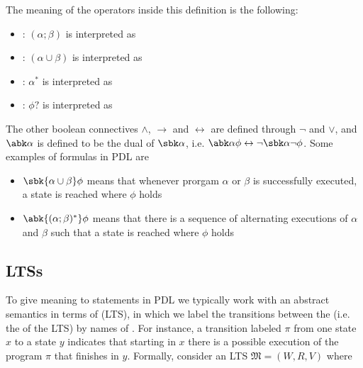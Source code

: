 \documentclass[a4paper, 12pt]{report}
\begin{document}
    The meaning of the operators inside this definition is the following:

    \begin{itemize}
        \item {}: $(\alpha ; \beta)$ is interpreted as 
        \item {}: $(\alpha \cup \beta)$ is interpreted as 
        \item {}: $\alpha^*$ is interpreted as 
        \item {}: $\phi?$ is interpreted as 
    \end{itemize}

    The other boolean connectives $\land$, $\to$ and $\leftrightarrow$ are defined through $\lnot$ and $\lor$, and $\abk \alpha$ is defined to be the dual of $\sbk \alpha$, i.e. $\abk \alpha \phi \leftrightarrow \lnot \sbk \alpha \lnot \phi$. Some examples of formulas in PDL are

    \begin{itemize}
        \item $\sbk{\alpha \cup \beta}\phi$ means that whenever prorgam $\alpha$ or $\beta$ is successfully executed, a state is reached where $\phi$ holds
        \item $\abk{(\alpha ; \beta)^*}\phi$ means that there is a sequence of alternating executions of $\alpha$ and $\beta$ such that a state is reached where $\phi$ holds
    \end{itemize}

    \subsection{LTSs}

    To give meaning to statements in PDL we typically work with an abstract semantics in terms of  (LTS), in which we label the transitions between the  (i.e. the  of the LTS) by names of . For instance, a transition labeled $\pi$ from one state $x$ to a state $y$ indicates that starting in $x$ there is a possible execution of the program $\pi$ that finishes in $y$. Formally, consider an LTS $\mathfrak M = (W, R, V)$ where
    
\end{document}
